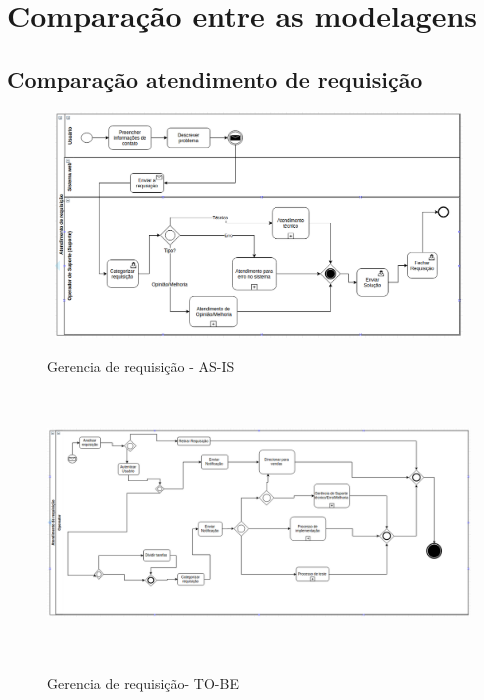 


\section{ Comparação entre as modelagens}

\subsection{Comparação atendimento de requisição}
\begin{figure}[!h]
\caption{Gerencia de requisição - AS-IS}
\centering %
\includegraphics[width=15cm,height=6cm]{as-is/01_atendimento_de_requisicao.png}
\label{figura:atendimento_requisicao_as_is}
\end{figure}


\begin{figure}[!h]
\caption{Gerencia de requisição- TO-BE}
\centering %
\includegraphics[width=16cm,height=7cm]{to_be/01_atendimento_de_requisicao.png}
\label{figura:atendimento_requisicao_to_be}
\end{figure}

\clearpage

